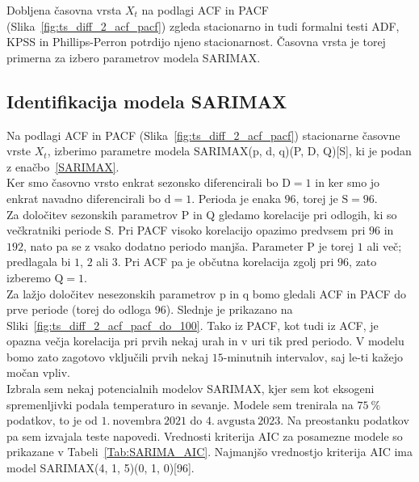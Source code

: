 \documentclass[a4paper, 11pt]{article}
\begin{document}
\noindent Dobljena časovna vrsta $X_t$ na podlagi ACF in PACF (Slika~\ref{fig:ts_diff_2_acf_pacf}) 
zgleda stacionarno in tudi formalni testi ADF, 
KPSS in Phillips-Perron potrdijo njeno stacionarnost. 
Časovna vrsta je torej primerna za izbero parametrov modela SARIMAX. 


\subsection{Identifikacija modela SARIMAX}

\noindent Na podlagi ACF in PACF (Slika~\ref{fig:ts_diff_2_acf_pacf}) stacionarne časovne vrste $X_t$, izberimo parametre 
modela SARIMAX(p, d, q)(P, D, Q)[S], ki je podan z enačbo~\eqref{SARIMAX}. \\

\noindent Ker smo časovno vrsto enkrat sezonsko diferencirali bo $\text{D} = 1$ in ker smo jo enkrat 
navadno diferencirali bo $\text{d} = 1$. Perioda je enaka $96$, torej je $\text{S} = 96$. \\

\noindent Za določitev sezonskih parametrov P in Q gledamo korelacije pri odlogih, ki so večkratniki periode S. Pri
PACF visoko korelacijo opazimo predvsem pri $96$ in $192$, nato pa se z vsako dodatno periodo manjša. Parameter P je torej 
$1$ ali več; predlagala bi $1$, $2$ ali $3$. 
Pri ACF pa je občutna korelacija zgolj pri $96$, zato izberemo $\text{Q} = 1$. \\

\noindent Za lažjo določitev nesezonskih parametrov p in q bomo gledali ACF in PACF do prve periode (torej do odloga 96). 
Slednje je prikazano na Sliki~\ref{fig:ts_diff_2_acf_pacf_do_100}. Tako iz PACF, kot tudi iz ACF, je opazna večja korelacija
pri prvih nekaj urah in v uri tik pred periodo. V modelu bomo zato zagotovo vključili prvih nekaj $15$-minutnih intervalov, 
saj le-ti kažejo močan vpliv. \\


\noindent Izbrala sem nekaj potencialnih modelov SARIMAX, kjer sem kot eksogeni spremenljivki podala temperaturo in sevanje.
Modele sem trenirala na $75~\%$ podatkov, to je od $1.~\text{novembra}~2021$ do $4.~\text{avgusta}~2023$. Na preostanku podatkov 
pa sem izvajala teste napovedi. 
Vrednosti kriterija AIC za posamezne modele so prikazane v Tabeli~\ref{Tab:SARIMA_AIC}. 
Najmanjšo vrednostjo kriterija AIC ima model SARIMAX(4, 1, 5)(0, 1, 0)[96]. \\
\end{document}
